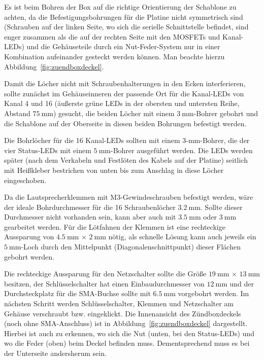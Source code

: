 \documentclass[paper=a4, parskip, numbers=noenddot, toc=listof, headsepline]{scrbook}
\begin{document}
					Es ist beim Bohren der Box auf die richtige Orientierung der Schablone zu achten, da die Befestigungsbohrungen für die Platine nicht symmetrisch sind (Schrauben auf der linken Seite, wo sich die serielle Schnittstelle befindet, sind enger zusammen als die auf der rechten Seite mit den MOSFETs und Kanal-LEDs) und die Gehäuseteile durch ein Nut-Feder-System nur in einer Kombination aufeinander gesteckt werden können. Man beachte hierzu Abbildung~\ref{fig:zuendboxdeckel}.

					Damit die Löcher nicht mit Schraubenhalterungen in den Ecken interferieren, sollte zunächst im Gehäuseinneren der passende Ort für die Kanal-LEDs von Kanal 4 und 16 (äußerste grüne LEDs in der obersten und untersten Reihe, Abstand $\SI{75}{\milli\metre}$) gesucht, die beiden Löcher mit einem $\SI{3}{\milli\metre}$-Bohrer gebohrt und die Schablone auf der Oberseite in diesen beiden Bohrungen befestigt werden.

					Die Bohrlöcher für die 16 Kanal-LEDs sollten mit einem 3-mm-Bohrer, die der vier Status-LEDs mit einem $\SI{5}{\milli\metre}$-Bohrer ausgeführt werden. Die LEDs werden später (nach dem Verkabeln und Festlöten des Kabels auf der Platine) seitlich mit Heißkleber bestrichen von unten bis zum Anschlag in diese Löcher eingeschoben.

					Da die Lautsprecherklemmen mit M3-Gewindeschrauben befestigt werden, wäre der ideale Bohrdurchmesser für die 16 Schraubenlöcher $\SI{3,2}{\milli\metre}$. Sollte dieser Durchmesser nicht vorhanden sein, kann aber auch mit $\SI{3,5}{\milli\metre}$ oder $\SI{3}{\milli\metre}$ gearbeitet werden. Für die Lötfahnen der Klemmen ist eine rechteckige Aussparung von $\SI{4,5}{\milli\metre}\,\times\,\SI{2}{\milli\metre}$ nötig, als schnelle Lösung kann auch jeweils ein $\SI{5}{\milli\metre}$-Loch durch den Mittelpunkt (Diagonalenschnittpunkt) dieser Flächen gebohrt werden.

					Die rechteckige Aussparung für den Netzschalter sollte die Größe $\SI{19}{\milli\metre}\,\times\,\SI{13}{\milli\metre}$ besitzen, der Schlüsselschalter hat einen Einbaudurchmesser von $\SI{12}{\milli\metre}$ und der Durchsteckplatz für die SMA-Buchse sollte mit $\SI{6,5}{\milli\metre}$ vorgebohrt werden. Im nächsten Schritt werden Schlüsselschalter, Klemmen und Netzschalter am Gehäuse verschraubt bzw. eingeklickt. Die Innenansicht des Zündboxdeckels (noch ohne SMA-Anschluss) ist in Abbildung~\ref{fig:zuendboxdeckel} dargestellt. Hierbei ist auch zu erkennen, wo sich die Nut (unten, bei den Status-LEDs) und wo die Feder (oben) beim Deckel befinden muss. Dementsprechend muss es bei der Unterseite andersherum sein.
\end{document}
